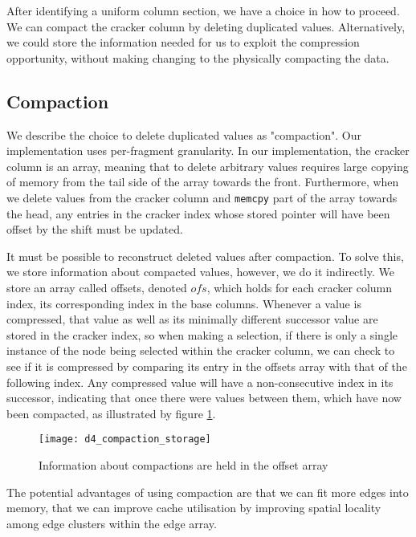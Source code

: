 After identifying a uniform column section, we have a choice in how to proceed. We can compact the cracker column by deleting duplicated values. Alternatively, we could store the information needed for us to exploit the compression opportunity, without making changing to the physically compacting the data.

\subsection{Compaction}

We describe the choice to delete duplicated values as "compaction". Our implementation uses per-fragment granularity. In our implementation, the cracker column is an array, meaning that to delete arbitrary values requires large copying of memory from the tail side of the array towards the front. Furthermore, when we delete values from the cracker column and \texttt{memcpy} part of the array towards the head, any entries in the cracker index whose stored pointer will have been offset by the shift must be updated.

It must be possible to reconstruct deleted values after compaction. To solve this, we store information about compacted values, however, we do it indirectly. We store an array called offsets, denoted $ofs$, which holds for each cracker column index, its corresponding index in the base columns. Whenever a value is compressed, that value as well as its minimally different successor value are stored in the cracker index, so when making a selection, if there is only a single instance of the node being selected within the cracker column, we can check to see if it is compressed by comparing its entry in the offsets array with that of the following index. Any compressed value will have a non-consecutive index in its successor, indicating that once there were values between them, which have now been compacted, as illustrated by figure \ref{fig:compaction_causes_non_consecutive_offset_entries}.

\begin{figure}[H]
  \centering
  \texttt{[image: d4\_compaction\_storage]}
  \caption{Information about compactions are held in the offset array}
  \label{fig:compaction_causes_non_consecutive_offset_entries}
\end{figure}

The potential advantages of using compaction are that we can fit more edges into memory, that we can improve cache utilisation by improving spatial locality among edge clusters within the edge array.

